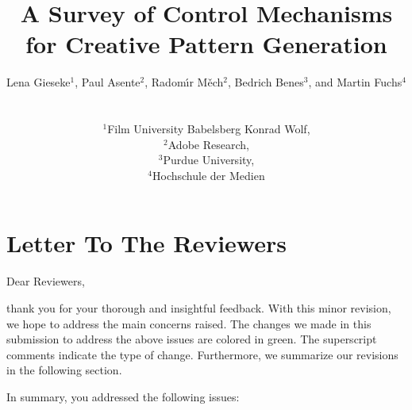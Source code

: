 \documentclass{egpubl}
\title[A Survey of Control Mechanisms for Creative Pattern Generation]%
      {A Survey of Control Mechanisms for Creative Pattern Generation}
\author[L. Gieseke, P. Asente, R. Mech, B. Benes, M. Fuchs]
{\parbox{\textwidth}{\centering Lena Gieseke$^{1}$, Paul Asente$^{2}$, Radom\'{\i}r M\v{e}ch$^{2}$, Bedrich Benes$^{3}$, and Martin Fuchs$^{4}$}
        \\
{\parbox{\textwidth}{\centering $^1$Film University Babelsberg Konrad Wolf,\\
         $^2$Adobe Research,\\
         $^3$Purdue University,\\
         $^4$Hochschule der Medien
       }
}
}
\begin{document}

\onecolumn %



\maketitle




\section*{Letter To The Reviewers}

Dear Reviewers,


thank you for your thorough and insightful feedback. With this minor revision, we hope to address the main concerns raised. The changes we made in this submission to address the above issues are colored in green. The superscript comments indicate the type of change. Furthermore, we summarize our revisions in the following section.

In summary, you addressed the following issues:


\end{document}
